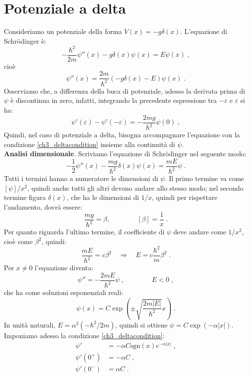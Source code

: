 \documentclass[12pt,a4paper]{report}
\theoremstyle{definition}
\numberwithin{equation}{section}
\newcommand{\Sch}{Schrödinger}
\begin{document}
\section{Potenziale a delta}
Consideriamo un potenziale della forma $V(x)=-g\delta(x)$. L'equazione di \Sch\; è:
\begin{equation}
-\frac{\hbar^2}{2m}\psi''(x)-g\delta(x)\psi(x)=E\psi(x)\;,
\end{equation}
cioè
$$
\psi''(x)=\frac{2m}{\hbar^2}(-g\delta(x)-E)\psi(x)\;.
$$
Osserviamo che, a differenza della buca di potenziale, adesso la derivata prima di $\psi$ è discontinua in zero, infatti, integrando la precedente espressione tra $-\varepsilon$ e $\varepsilon$ si ha:
\begin{equation}
\psi'(\varepsilon)-\psi'(-\varepsilon)=-\frac{2mg}{\hbar^2}\psi(0)\;, \label{ch3_deltacondition}
\end{equation}
Quindi, nel caso di potenziale a delta, bisogna accompagnare l'equazione con la condizione \eqref{ch3_deltacondition} insieme alla continuità di $\psi$. \\
\textbf{Analisi dimensionale}. Scriviamo l'equazione di \Sch\; nel seguente modo:
\begin{equation}
-\frac{1}{2}\psi''(x)-\frac{mg}{\hbar^2}\delta(x)\psi(x)=\frac{mE}{\hbar^2}\psi\;.
\end{equation}
Tutti i termini hanno a numeratore le dimensioni di $\psi$. Il primo termine va come $[\psi]/x^2$, quindi anche tutti gli altri devono andare allo stesso modo; nel secondo termine figura $\delta(x)$, che ha le dimensioni di $1/x$, quindi per rispettare l'andamento, dovrà essere:
\begin{equation}
\frac{mg}{\hbar^2}=\beta, \qquad \qquad [\beta]=\frac{1}{x}\;.
\end{equation}
Per quanto riguarda l'ultimo termine, il coefficiente di $\psi$ deve andare come $1/x^2$, cioè come $\beta^2$, quindi:
\begin{equation}
\frac{mE}{\hbar^2}=c\beta^2\quad  \Longrightarrow\quad  E=c\frac{\hbar^2}{m}\beta^2\;.
\end{equation}
Per $x\ne 0$ l'equazione diventa:
$$
\psi''=-\frac{2mE}{\hbar^2}\psi\;,\qquad\qquad E<0\;,
$$
che ha come soluzioni esponenziali reali:
$$
\psi(x)=C\exp\left(\pm\sqrt{\frac{2m|E|}{\hbar^2}} x\right)\;.
$$
In unità naturali, $E=\alpha^2(-\hbar^2/2m)$, quindi si ottiene $\psi=C\exp(-\alpha|x|)$. Imponiamo adesso la condizione \eqref{ch3_deltacondition}:
\begin{align*}
\psi' &=-\alpha C\mathrm{sgn}(x)e^{-\alpha|x|}\;, \\
\psi'(0^+) &= -\alpha C\;, \\
\psi'(0^-) &= \alpha C\;.
\end{align*}
\end{document}
